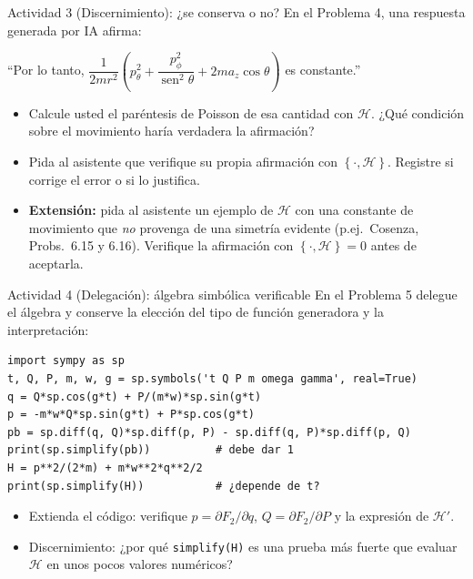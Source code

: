 \documentclass[spanish]{beamer}
\providecommand{\sen}{\operatorname{sen}}
\newcommand{\Ham}{\mathcal{H}}
\newcommand{\pb}[2]{\left\{#1,#2\right\}}   %
\begin{document}
\begin{frame}{Actividad 3 (Discernimiento): ¿se conserva o no?}
En el Problema 4, una respuesta generada por IA afirma:
\begin{center}
``Por lo tanto,
$\dfrac{1}{2mr^2}\left( p_\theta^2 + \dfrac{p_\phi^2}{\sen^2\theta} + 2ma_z\cos\theta \right)$
es constante.''
\end{center}
\begin{itemize}
  \item<2-> Calcule usted el paréntesis de Poisson de esa cantidad con $\Ham$.
        ¿Qué condición sobre el movimiento haría verdadera la afirmación?
  \item<3-> Pida al asistente que verifique su propia afirmación con
        $\pb{\cdot}{\Ham}$. Registre si corrige el error o si lo justifica.
  \item<4-> \textbf{Extensión:} pida al asistente un ejemplo de $\Ham$ con una constante
        de movimiento que \emph{no} provenga de una simetría evidente
        (p.ej.\ Cosenza, Probs.~6.15 y 6.16). Verifique la afirmación con
        $\pb{\cdot}{\Ham}=0$ antes de aceptarla.
\end{itemize}
\end{frame}

\begin{frame}[fragile]{Actividad 4 (Delegación): álgebra simbólica verificable}
En el Problema 5 delegue el álgebra y conserve la elección del tipo de función
generadora y la interpretación:
\footnotesize
\begin{verbatim}
import sympy as sp
t, Q, P, m, w, g = sp.symbols('t Q P m omega gamma', real=True)
q = Q*sp.cos(g*t) + P/(m*w)*sp.sin(g*t)
p = -m*w*Q*sp.sin(g*t) + P*sp.cos(g*t)
pb = sp.diff(q, Q)*sp.diff(p, P) - sp.diff(q, P)*sp.diff(p, Q)
print(sp.simplify(pb))          # debe dar 1
H = p**2/(2*m) + m*w**2*q**2/2
print(sp.simplify(H))           # ¿depende de t?
\end{verbatim}
\normalsize
\begin{itemize}
  \item Extienda el código: verifique $p=\partial F_2/\partial q$, $Q=\partial F_2/\partial P$
        y la expresión de $\Ham'$.
  \item Discernimiento: ¿por qué \texttt{simplify(H)} es una prueba más fuerte
        que evaluar $\Ham$ en unos pocos valores numéricos?
\end{itemize}
\end{frame}
\end{document}
